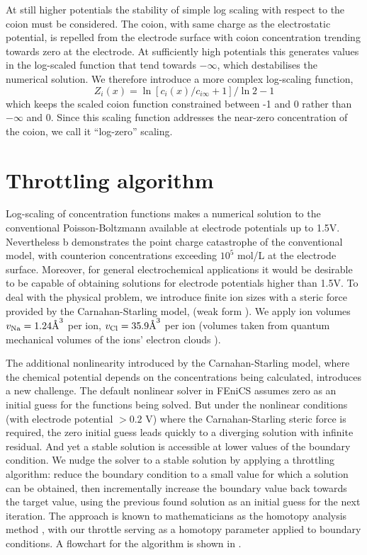 At still higher potentials the stability of simple log scaling with
respect to the coion must be considered. The coion, with same charge
as the electrostatic potential, is repelled from the electrode surface
with coion concentration trending towards zero at the electrode. At
sufficiently high potentials this generates values in the log-scaled
function that tend towards $-\infty$, which destabilises the numerical
solution. We therefore introduce a more complex log-scaling function,
\begin{equation}
Z_i(x) = \ln\left[c_i(x)/c_{i\infty}+1\right]/\ln 2 - 1
\label{log_zero}
\end{equation}
which keeps the scaled coion function constrained between -1 and 0
rather than $-\infty$ and 0. Since this scaling function addresses the
near-zero concentration of the coion, we call it ``log-zero'' scaling.

\section{Throttling algorithm}

Log-scaling of concentration functions makes a numerical solution to
the conventional Poisson-Boltzmann available at electrode potentials
up to 1.5V. Nevertheless b demonstrates the
point charge catastrophe of the conventional model, with counterion
concentrations exceeding $10^{5}$ mol/L at the electrode
surface. Moreover, for general electrochemical applications it would
be desirable to be capable of obtaining solutions for electrode
potentials higher than 1.5V. To deal with the physical problem, we
introduce finite ion sizes with a steric force provided by the
Carnahan-Starling model,  (weak form
).  We apply ion volumes
$v_{\ce{Na}}=1.24 \text{\AA}^{3}$ per  ion,
$v_{\ce{Cl}}=35.9 \text{\AA}^{3}$ per  ion (volumes taken from
quantum mechanical volumes of the ions' electron clouds
\cite{ParsonsNinham2009}).

The additional nonlinearity introduced by the Carnahan-Starling model,
where the chemical potential depends on the concentrations being
calculated, introduces a new challenge. The default nonlinear solver
in FEniCS assumes zero as an initial guess for the functions being
solved. But under the nonlinear conditions (with electrode potential
$>0.2$ V) where the Carnahan-Starling steric force is required, the
zero initial guess leads quickly to a diverging solution with infinite
residual. And yet a stable solution is accessible at lower values of
the boundary condition. We nudge the solver to a stable solution by
applying a throttling algorithm: reduce the boundary condition to a
small value for which a solution can be obtained, then incrementally
increase the boundary value back towards the target value, using the
previous found solution as an initial guess for the next
iteration. The approach is known to mathematicians as the homotopy
analysis method \cite{homotopy_analysis_Liao2012}, with our throttle
serving as a homotopy parameter applied to boundary conditions.
A flowchart for the algorithm is
shown in .

